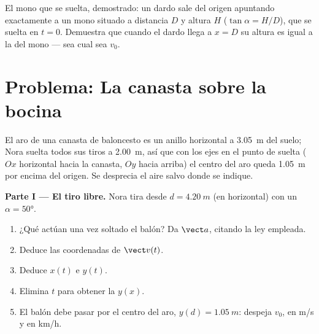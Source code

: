 \begin{exercise}[$\star\star\star$]\label{exo:g12:projectile-motion:15}
El mono que se suelta, demostrado: un dardo sale del origen apuntando exactamente a un
mono situado a distancia $D$ y altura $H$ ($\tan\alpha = H/D$), que se suelta en
$t = 0$. Demuestra que cuando el dardo llega a $x = D$ su altura es igual a la del
mono --- sea cual sea $v_0$.
\end{exercise}

\section{Problema: La canasta sobre la bocina}

\begin{problem}
\label{pb:g12:projectile-motion:1}
El aro de una canasta de baloncesto es un anillo horizontal a \qty{3.05}{m} del suelo;
Nora suelta todos sus tiros a \qty{2.00}{m}, así que con los ejes en el punto de
suelta ($Ox$ horizontal hacia la canasta, $Oy$ hacia arriba) el centro del aro queda
\qty{1.05}{m} por encima del origen. Se desprecia el aire salvo donde se indique.

\medskip\noindent\textbf{Parte I --- El tiro libre.} Nora tira desde
$d = \qty{4.20}{m}$ (en horizontal) con un  $\alpha = \ang{50}$.
\begin{enumerate}
  \item ¿Qué  actúan una vez soltado el balón? Da $\vect a$, citando la ley
        empleada.
  \item Deduce las coordenadas de $\vect v(t)$.
  \item Deduce $x(t)$ e $y(t)$.
  \item Elimina $t$ para obtener la  $y(x)$.
  \item El balón debe pasar por el centro del aro, $y(d) = \qty{1.05}{m}$: despeja
        $v_0$, en \unit{m/s} y en \unit{km/h}.
\end{enumerate}


\end{problem}
